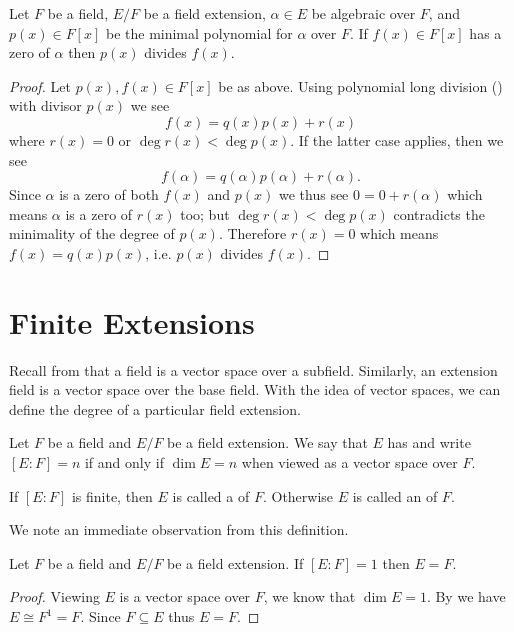 \begin{corollary}\label{corollary-minimal-polynomial-divides-polynomial-with-same-root}
    Let $F$ be a field, $E/F$ be a field extension, $\alpha \in E$ be algebraic over $F$, and $p(x) \in F[x]$ be the minimal polynomial for $\alpha$ over $F$. If $f(x) \in F[x]$ has a zero of $\alpha$ then $p(x)$ divides $f(x)$.
\end{corollary}
\begin{proof}
    Let $p(x), f(x) \in F[x]$ be as above. Using polynomial long division () with divisor $p(x)$ we see
    \[
        f(x) = q(x)p(x) + r(x)
    \]
    where $r(x) = 0$ or $\deg r(x) < \deg p(x)$. If the latter case applies, then we see
    \[
        f(\alpha) = q(\alpha)p(\alpha) + r(\alpha).
    \]
    Since $\alpha$ is a zero of both $f(x)$ and $p(x)$ we thus see $0 = 0 + r(\alpha)$ which means $\alpha$ is a zero of $r(x)$ too; but $\deg r(x) < \deg p(x)$ contradicts the minimality of the degree of $p(x)$. Therefore $r(x) = 0$ which means $f(x) = q(x)p(x)$, i.e. $p(x)$ divides $f(x)$.
\end{proof}

\section{Finite Extensions}
Recall from  that a field is a vector space over a subfield. Similarly, an extension field is a vector space over the base field. With the idea of vector spaces, we can define the degree of a particular field extension.

\begin{definition}
    Let $F$ be a field and $E/F$ be a field extension. We say that $E$ has  and write $[E:F] = n$ if and only if $\dim E = n$ when viewed as a vector space over $F$.

    If $[E:F]$ is finite, then $E$ is called a  of $F$. Otherwise $E$ is called an  of $F$.
\end{definition}

We note an immediate observation from this definition.
\begin{proposition}\label{prop-finite-extension-of-degree-1-means-extension-equals-base-field}
    Let $F$ be a field and $E/F$ be a field extension. If $[E:F] = 1$ then $E = F$.
\end{proposition}
\begin{proof}
    Viewing $E$ is a vector space over $F$, we know that $\dim E = 1$. By  we have $E\cong F^1 = F$. Since $F \subseteq E$ thus $E = F$.
\end{proof}

